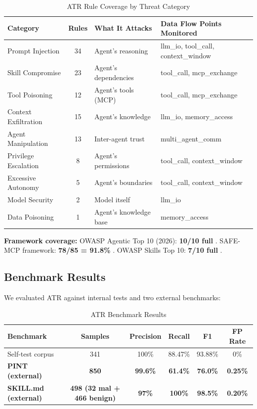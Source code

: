 \documentclass[11pt,letterpaper]{article}
\begin{document}
\begin{table}[htbp]
\centering
\caption{ATR Rule Coverage by Threat Category}
\label{tab:coverage}
\footnotesize
\begin{tabularx}{\textwidth}{lclX}
\toprule
\textbf{Category} & \textbf{Rules} & \textbf{What It Attacks} & \textbf{Data Flow Points Monitored} \\
\midrule
Prompt Injection & 34 & Agent's reasoning & llm\_io, tool\_call, context\_window \\
Skill Compromise & 23 & Agent's dependencies & tool\_call, mcp\_exchange \\
Tool Poisoning & 12 & Agent's tools (MCP) & tool\_call, mcp\_exchange \\
Context Exfiltration & 15 & Agent's knowledge & llm\_io, memory\_access \\
Agent Manipulation & 13 & Inter-agent trust & multi\_agent\_comm \\
Privilege Escalation & 8 & Agent's permissions & tool\_call, context\_window \\
Excessive Autonomy & 5 & Agent's boundaries & tool\_call, context\_window \\
Model Security & 2 & Model itself & llm\_io \\
Data Poisoning & 1 & Agent's knowledge base & memory\_access \\
\bottomrule
\end{tabularx}
\end{table}

\textbf{Framework coverage:} OWASP Agentic Top 10 (2026): \textbf{10/10 full} \cite{owaspagentic}. SAFE-MCP framework: \textbf{78/85 = 91.8\%} \cite{safemcp}. OWASP Skills Top 10: \textbf{7/10 full} \cite{owaspllm}.


\subsection{Benchmark Results}

We evaluated ATR against internal tests and two external benchmarks:

\begin{table}[htbp]
\centering
\caption{ATR Benchmark Results}
\label{tab:benchresults}
\begin{tabular}{lccccc}
\toprule
\textbf{Benchmark} & \textbf{Samples} & \textbf{Precision} & \textbf{Recall} & \textbf{F1} & \textbf{FP Rate} \\
\midrule
Self-test corpus & 341 & 100\% & 88.47\% & 93.88\% & 0\% \\
\textbf{PINT (external)} & \textbf{850} & \textbf{99.6\%} & \textbf{61.4\%} & \textbf{76.0\%} & \textbf{0.25\%} \\
\textbf{SKILL.md (external)} & \textbf{498 (32 mal + 466 benign)} & \textbf{97\%} & \textbf{100\%} & \textbf{98.5\%} & \textbf{0.20\%} \\
\bottomrule
\end{tabular}
\end{table}
\end{document}
